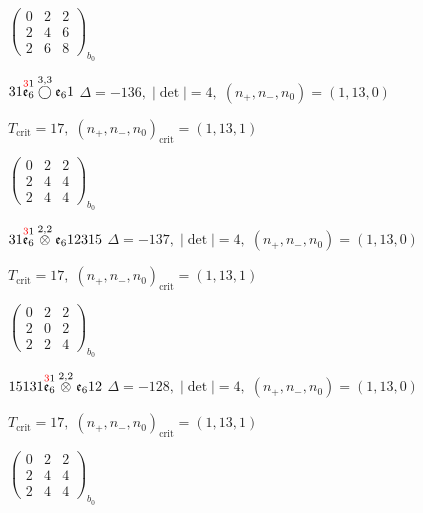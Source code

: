 \documentclass[10pt]{article}
\begin{document}
\hspace{2em}$\left(\begin{smallmatrix}0 & 2 & 2 \\ 2 & 4 & 6 \\ 2 & 6 & 8\end{smallmatrix}\right)_{\!b_0}$

\smallskip

$31\overset{\textcolor{red}{3}1}{\mathfrak{e}_6}\overset{3,3}{\bigcirc}\mathfrak{e}_61$ \quad $\Delta=-136,\; |\det|=4,\; (n_+,n_-,n_0)=(1,13,0)$

\hspace{1em}$T_{\text{crit}}=17,\; (n_+,n_-,n_0)_{\text{crit}}=(1,13,1)$

\hspace{2em}$\left(\begin{smallmatrix}0 & 2 & 2 \\ 2 & 4 & 4 \\ 2 & 4 & 4\end{smallmatrix}\right)_{\!b_0}$

\smallskip

$31\overset{\textcolor{red}{3}1}{\mathfrak{e}_6}\overset{2,2}{\otimes}\mathfrak{e}_612315$ \quad $\Delta=-137,\; |\det|=4,\; (n_+,n_-,n_0)=(1,13,0)$

\hspace{1em}$T_{\text{crit}}=17,\; (n_+,n_-,n_0)_{\text{crit}}=(1,13,1)$

\hspace{2em}$\left(\begin{smallmatrix}0 & 2 & 2 \\ 2 & 0 & 2 \\ 2 & 2 & 4\end{smallmatrix}\right)_{\!b_0}$

\smallskip

$15131\overset{\textcolor{red}{3}1}{\mathfrak{e}_6}\overset{2,2}{\otimes}\mathfrak{e}_612$ \quad $\Delta=-128,\; |\det|=4,\; (n_+,n_-,n_0)=(1,13,0)$

\hspace{1em}$T_{\text{crit}}=17,\; (n_+,n_-,n_0)_{\text{crit}}=(1,13,1)$

\hspace{2em}$\left(\begin{smallmatrix}0 & 2 & 2 \\ 2 & 4 & 4 \\ 2 & 4 & 4\end{smallmatrix}\right)_{\!b_0}$
\end{document}
